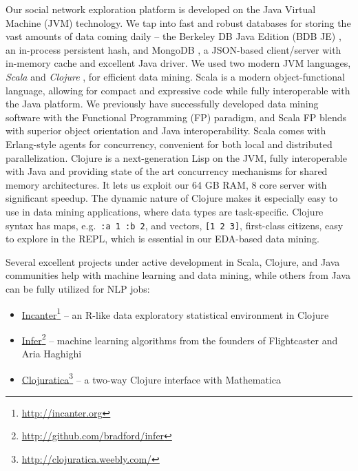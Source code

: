 \documentclass[10pt,oneside]{memoir}
\begin{document}
\begin{Spacing}{2}
\label{impl:Clojure}


Our social network exploration platform is developed on the Java Virtual Machine (JVM) technology. We tap into fast and robust databases for storing the vast amounts of data coming daily -- the Berkeley DB Java Edition (BDB JE) \cite{code:berkeleydb}, an in-process persistent hash, and MongoDB \cite{code:mongodb}, a JSON-based client/server with in-memory cache and excellent Java driver. We used two modern JVM languages, {\itshape Scala} \cite{code:scala} and {\itshape Clojure} \cite{code:clojure}, for efficient data mining. Scala is a modern object-functional language, allowing for compact and expressive code while fully interoperable with the Java platform. We previously have successfully developed data mining software with the Functional Programming (FP) paradigm, and Scala FP blends with superior object orientation and Java interoperability.  Scala comes with Erlang-style agents for concurrency, convenient for both local and distributed parallelization.  Clojure is a next-generation Lisp on the JVM, fully interoperable with Java and providing state of the art concurrency mechanisms for shared memory architectures.  It lets us exploit our 64 GB RAM, 8 core server with significant speedup.  The dynamic nature of Clojure makes it especially easy to use in data mining applications, where data types are task-specific.  Clojure syntax has maps, e.g.\ \texttt{{:a 1 :b 2}}, and vectors, \texttt{[1 2 3]}, first-class citizens, easy to explore in the REPL, which is essential in our EDA-based data mining.


Several excellent projects under active development in Scala, Clojure, and Java communities help with machine learning and data mining, while others from Java can be fully utilized for NLP jobs:


\begin{itemize}


\item \href{http://incanter.org}{Incanter}\footnote{\href{http://incanter.org}{http://incanter.org}} -- an R-like data exploratory statistical environment in Clojure

\item \href{http://github.com/bradford/infer}{Infer}\footnote{\href{http://github.com/bradford/infer}{http://github.com/bradford/infer}} -- machine learning algorithms from the founders of Flightcaster and Aria Haghighi

\item \href{http://clojuratica.weebly.com/}{Clojuratica}\footnote{\href{http://clojuratica.weebly.com/}{http://clojuratica.weebly.com/}} -- a two-way Clojure interface with Mathematica


\end{itemize}
\end{Spacing}
\end{document}
